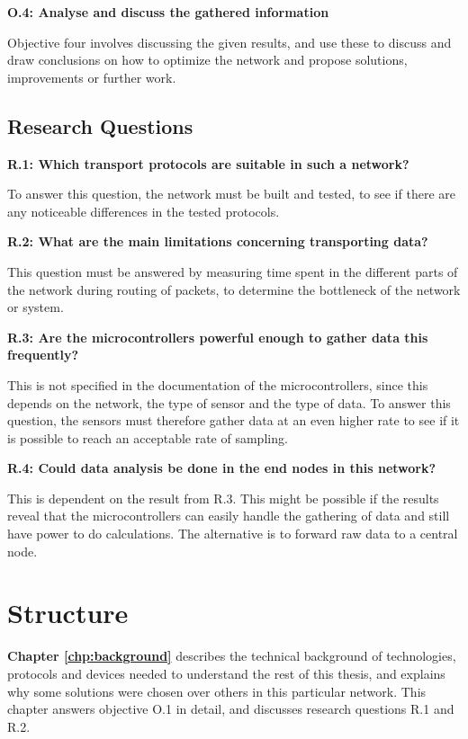 \newpage
\noindent\textbf{O.4: Analyse and discuss the gathered information}

\noindent Objective four involves discussing the given results, and use these to discuss and draw conclusions on how to optimize the network and propose solutions, improvements or further work. 

\subsection{Research Questions}

\noindent \textbf{R.1: Which transport protocols are suitable in such a network?}

\noindent To answer this question, the network must be built and tested, to see if there are any noticeable differences in the tested protocols.

\noindent\textbf{R.2: What are the main limitations concerning transporting data?}

\noindent This question must be answered by measuring time spent in the different parts of the network during routing of packets, to determine the bottleneck of the network or system. 

\noindent\textbf{R.3: Are the \glspl{microcontroller} powerful enough to gather data this frequently?}

\noindent This is not specified in the documentation of the \glspl{microcontroller}, since this depends on the network, the type of sensor and the type of data. To answer this question, the sensors must therefore gather data at an even higher rate to see if it is possible to reach an acceptable rate of sampling. 

\noindent\textbf{R.4: Could data analysis be done in the end nodes in this network?}

\noindent This is dependent on the result from R.3. This might be possible if the results reveal that the \glspl{microcontroller} can easily handle the gathering of data and still have power to do calculations. The alternative is to forward raw data to a central node. 

\section{Structure}


\noindent \textbf{Chapter \ref{chp:background}} describes the technical background of technologies, protocols and devices needed to understand the rest of this thesis, and explains why some solutions were chosen over others in this particular network. This chapter answers objective O.1 in detail, and discusses research questions R.1 and R.2. 

